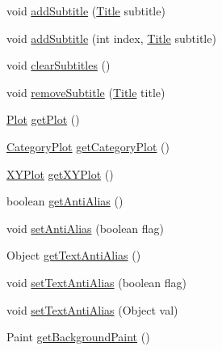 \begin{DoxyCompactItemize}
void \mbox{\hyperlink{classorg_1_1jfree_1_1chart_1_1_j_free_chart_a511d69d8b64444f31c59761a1c7ba8f8}{add\+Subtitle}} (\mbox{\hyperlink{classorg_1_1jfree_1_1chart_1_1title_1_1_title}{Title}} subtitle)
\item 
void \mbox{\hyperlink{classorg_1_1jfree_1_1chart_1_1_j_free_chart_a4c51318305b6f49bceafb9132c5ccd0c}{add\+Subtitle}} (int index, \mbox{\hyperlink{classorg_1_1jfree_1_1chart_1_1title_1_1_title}{Title}} subtitle)
\item 
void \mbox{\hyperlink{classorg_1_1jfree_1_1chart_1_1_j_free_chart_aa1ac67940797332b676a8dd7a604ed78}{clear\+Subtitles}} ()
\item 
void \mbox{\hyperlink{classorg_1_1jfree_1_1chart_1_1_j_free_chart_a8b70d1ac67e20b9d3e4df05cc03cd774}{remove\+Subtitle}} (\mbox{\hyperlink{classorg_1_1jfree_1_1chart_1_1title_1_1_title}{Title}} title)
\item 
\mbox{\hyperlink{classorg_1_1jfree_1_1chart_1_1plot_1_1_plot}{Plot}} \mbox{\hyperlink{classorg_1_1jfree_1_1chart_1_1_j_free_chart_aac70289d4ca81df3434b476f54286ee7}{get\+Plot}} ()
\item 
\mbox{\hyperlink{classorg_1_1jfree_1_1chart_1_1plot_1_1_category_plot}{Category\+Plot}} \mbox{\hyperlink{classorg_1_1jfree_1_1chart_1_1_j_free_chart_a3ae7a5bbe055395e7fcdaef063e11e25}{get\+Category\+Plot}} ()
\item 
\mbox{\hyperlink{classorg_1_1jfree_1_1chart_1_1plot_1_1_x_y_plot}{X\+Y\+Plot}} \mbox{\hyperlink{classorg_1_1jfree_1_1chart_1_1_j_free_chart_a0a23cad609e1875851f78b8846b356fc}{get\+X\+Y\+Plot}} ()
\item 
boolean \mbox{\hyperlink{classorg_1_1jfree_1_1chart_1_1_j_free_chart_a78d60bae89b02c231f4417d4da838dfc}{get\+Anti\+Alias}} ()
\item 
void \mbox{\hyperlink{classorg_1_1jfree_1_1chart_1_1_j_free_chart_a31e3f57a186d4183037230520e97fc9d}{set\+Anti\+Alias}} (boolean flag)
\item 
Object \mbox{\hyperlink{classorg_1_1jfree_1_1chart_1_1_j_free_chart_a80d0c9c6238fbfc3a956f0bf382ab190}{get\+Text\+Anti\+Alias}} ()
\item 
void \mbox{\hyperlink{classorg_1_1jfree_1_1chart_1_1_j_free_chart_aedfada089f57c36fbd4c5ea025aacb7f}{set\+Text\+Anti\+Alias}} (boolean flag)
\item 
void \mbox{\hyperlink{classorg_1_1jfree_1_1chart_1_1_j_free_chart_a9a0b1e4d2667ad9e3def3c1e7ea9a94e}{set\+Text\+Anti\+Alias}} (Object val)
\item 
Paint \mbox{\hyperlink{classorg_1_1jfree_1_1chart_1_1_j_free_chart_af0544f25aaf27bda9f06147c249156f3}{get\+Background\+Paint}} ()

\end{DoxyCompactItemize}
